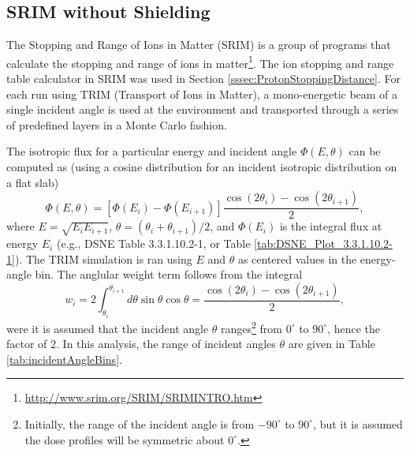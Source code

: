 \documentclass{hitec}
\begin{document}
\subsection{SRIM without Shielding}\label{ssec:SRIMnoShielding}

The Stopping and Range of Ions in Matter (SRIM) \citep{ziegler2009srim} is a group of programs that calculate the stopping and range of ions in matter\footnote{\url{http://www.srim.org/SRIM/SRIMINTRO.htm}}. The ion stopping and range table calculator in SRIM was used in Section \ref{sssec:ProtonStoppingDistance}. For each run using TRIM (Transport of Ions in Matter), a mono-energetic beam of a single incident angle is used at the environment and transported through a series of predefined layers in a Monte Carlo fashion.

The isotropic flux for a particular energy and incident angle $\Phi(E,\theta)$ can be computed as (using a cosine distribution for an incident isotropic distribution on a flat slab)
\begin{equation}
\Phi(E,\theta) = [\Phi(E_i) - \Phi(E_{i+1})] \frac{\cos(2\theta_i) - \cos(2\theta_{i+1})}{2},
\end{equation}
where $E = \sqrt{E_i E_{i+1}}$, $\theta = (\theta_i + \theta_{i+1})/2$, and $\Phi(E_i)$ is the integral flux at energy $E_i$ (e.g., DSNE Table 3.3.1.10.2-1, or Table \ref{tab:DSNE_Plot_3.3.1.10.2-1}). The TRIM simulation is ran using $E$ and $\theta$ as centered values in the energy-angle bin. The anglular weight term follows from the integral
\begin{equation}
w_i = 2\int_{\theta_i}^{\theta_{i+1}}d\theta\sin\theta\cos\theta = \frac{\cos(2\theta_i) - \cos(2\theta_{i+1})}{2},
\end{equation}
were it is assumed that the incident angle $\theta$ ranges\footnote{Initially, the range of the incident angle is from $-90^\circ$ to $90^\circ$, but it is assumed the dose profiles will be symmetric about $0^\circ$.} from $0^\circ$ to $90^\circ$, hence the factor of $2$. In this analysis, the range of incident angles $\theta$ are given in Table \ref{tab:incidentAngleBins}.
\end{document}
